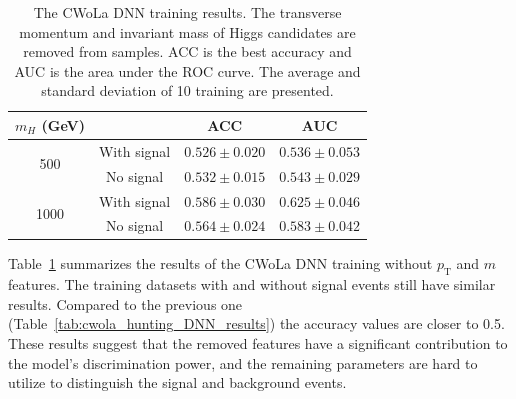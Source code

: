 \documentclass[12pt]{article}
\begin{document}
		\begin{table}[htpb]
			\centering
			\caption{The CWoLa DNN training results. The transverse momentum and invariant mass of Higgs candidates are removed from samples. ACC is the best accuracy and AUC is the area under the ROC curve. The average and standard deviation of 10 training are presented.}
			\label{tab:cwola_hunting_DNN_results_wo_pt_m}
			\begin{tabular}{c|c|cc}
				$m_H$ (GeV)           &             & ACC               & AUC               \\ \hline
				\multirow{2}{*}{500}  & With signal & $0.526 \pm 0.020$ & $0.536 \pm 0.053$ \\
									  & No signal   & $0.532 \pm 0.015$ & $0.543 \pm 0.029$ \\ \hline
				\multirow{2}{*}{1000} & With signal & $0.586 \pm 0.030$ & $0.625 \pm 0.046$ \\
									  & No signal   & $0.564 \pm 0.024$ & $0.583 \pm 0.042$
			\end{tabular}
		\end{table}

		 Table~\ref{tab:cwola_hunting_DNN_results_wo_pt_m} summarizes the results of the CWoLa DNN training without $p_{\text{T}}$ and $m$ features. The training datasets with and without signal events still have similar results. Compared to the previous one (Table~\ref{tab:cwola_hunting_DNN_results}) the accuracy values are closer to 0.5. These results suggest that the removed features have a significant contribution to the model's discrimination power, and the remaining parameters are hard to utilize to distinguish the signal and background events.
\end{document}
